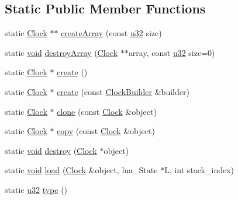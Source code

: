 \subsection*{Static Public Member Functions}
\begin{DoxyCompactItemize}
\item 
static \mbox{\hyperlink{classnjli_1_1_clock}{Clock}} $\ast$$\ast$ \mbox{\hyperlink{classnjli_1_1_clock_a0cb02d4753cddc5aa00236c2f37f66f3}{create\+Array}} (const \mbox{\hyperlink{_util_8h_a10e94b422ef0c20dcdec20d31a1f5049}{u32}} size)
\item 
static \mbox{\hyperlink{_thread_8h_af1e856da2e658414cb2456cb6f7ebc66}{void}} \mbox{\hyperlink{classnjli_1_1_clock_a4d8b6dbf9cf4eae3be8bca7ac498ad2b}{destroy\+Array}} (\mbox{\hyperlink{classnjli_1_1_clock}{Clock}} $\ast$$\ast$array, const \mbox{\hyperlink{_util_8h_a10e94b422ef0c20dcdec20d31a1f5049}{u32}} size=0)
\item 
static \mbox{\hyperlink{classnjli_1_1_clock}{Clock}} $\ast$ \mbox{\hyperlink{classnjli_1_1_clock_a15b98bdfd4c744f0f3de68cacec783ab}{create}} ()
\item 
static \mbox{\hyperlink{classnjli_1_1_clock}{Clock}} $\ast$ \mbox{\hyperlink{classnjli_1_1_clock_a3cab98e8e835a0a113b8211846356c76}{create}} (const \mbox{\hyperlink{classnjli_1_1_clock_builder}{Clock\+Builder}} \&builder)
\item 
static \mbox{\hyperlink{classnjli_1_1_clock}{Clock}} $\ast$ \mbox{\hyperlink{classnjli_1_1_clock_af5238b0b80730c0b42194fe8c5b3cc07}{clone}} (const \mbox{\hyperlink{classnjli_1_1_clock}{Clock}} \&object)
\item 
static \mbox{\hyperlink{classnjli_1_1_clock}{Clock}} $\ast$ \mbox{\hyperlink{classnjli_1_1_clock_a6b20a66ca32c33acce1edebaf5ac0420}{copy}} (const \mbox{\hyperlink{classnjli_1_1_clock}{Clock}} \&object)
\item 
static \mbox{\hyperlink{_thread_8h_af1e856da2e658414cb2456cb6f7ebc66}{void}} \mbox{\hyperlink{classnjli_1_1_clock_a4147bdb4d31e3402ba76ccd9652c50e0}{destroy}} (\mbox{\hyperlink{classnjli_1_1_clock}{Clock}} $\ast$object)
\item 
static \mbox{\hyperlink{_thread_8h_af1e856da2e658414cb2456cb6f7ebc66}{void}} \mbox{\hyperlink{classnjli_1_1_clock_a8581e8a61763f24e24929a4806387cdb}{load}} (\mbox{\hyperlink{classnjli_1_1_clock}{Clock}} \&object, lua\+\_\+\+State $\ast$L, int stack\+\_\+index)
\item 
static \mbox{\hyperlink{_util_8h_a10e94b422ef0c20dcdec20d31a1f5049}{u32}} \mbox{\hyperlink{classnjli_1_1_clock_afa83aa79eb78706cf661e973a1258c2f}{type}} ()
\end{DoxyCompactItemize}
